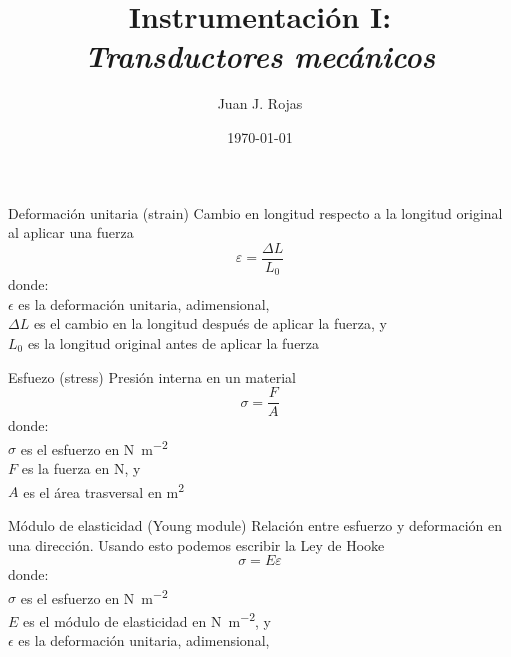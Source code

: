 \documentclass[aspectratio=169]{beamer}
\title{Instrumentación I: \\ \emph{Transductores mecánicos}}
\author{
    Juan J. Rojas
}
\institute{Instituto Tecnológico de Costa Rica}
\date{\today}
\begin{document}

\maketitle

\newcommand{\blackandwhite}{white} %

\begin{frame}[t]{Deformación unitaria (strain)}
    Cambio en longitud respecto a la longitud original al aplicar una fuerza
    \vspace{0.5cm}
    \begin{equation*}
        \varepsilon = \dfrac{\Delta L }{L_0}
    \end{equation*}
    donde:\\
    $\epsilon$ es la deformación unitaria, adimensional,\\
    $\Delta L$ es el cambio en la longitud después de aplicar la fuerza, y\\ 
    $L_0$ es la longitud original antes de aplicar la fuerza
\end{frame}

\begin{frame}[t]{Esfuezo (stress)}
    Presión interna en un material
    \vspace{0.5cm}
    \begin{equation*}
        \sigma = \dfrac{F}{A}
    \end{equation*}
    donde:\\
    $\sigma$ es el esfuerzo en \si{\newton\meter^{-2}}\\
    $F$ es la fuerza en \si{\newton}, y\\ 
    $A$ es el área trasversal en  \si{\meter^{2}}
\end{frame}

\begin{frame}[t]{Módulo de elasticidad (Young module)}
    Relación entre esfuerzo y deformación en una dirección. Usando esto podemos escribir la Ley de Hooke
    \vspace{0.5cm}
    \begin{equation*}
        \sigma = E\varepsilon
    \end{equation*}
    donde:\\
    $\sigma$ es el esfuerzo en \si{\newton\meter^{-2}}\\
    $E$ es el módulo de elasticidad en \si{\newton\meter^{-2}}, y\\ 
    $\epsilon$ es la deformación unitaria, adimensional,\\
\end{frame}
\end{document}
